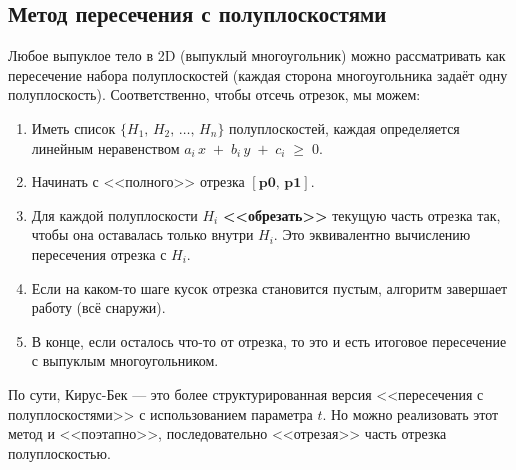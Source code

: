 \documentclass[areasetadvanced]{scrartcl}
\begin{document}
\subsection{Метод пересечения с полуплоскостями}
Любое выпуклое тело в 2D (выпуклый многоугольник) можно рассматривать как 
пересечение набора полуплоскостей (каждая сторона многоугольника задаёт 
одну полуплоскость). Соответственно, чтобы отсечь отрезок, мы можем:

\begin{enumerate}
    \item Иметь список \(\{H_1,\,H_2,\,\dots,\,H_n\}\) полуплоскостей, 
    каждая определяется линейным неравенством 
    \(a_i\,x \;+\; b_i\,y \;+\; c_i \;\ge\; 0\).
    \item Начинать с <<полного>> отрезка \([\mathbf{p0},\, \mathbf{p1}]\).
    \item Для каждой полуплоскости \(H_i\) \textbf{<<обрезать>>} текущую 
    часть отрезка так, чтобы она оставалась только внутри \(H_i\). 
    Это эквивалентно вычислению пересечения отрезка с \(H_i\).
    \item Если на каком-то шаге кусок отрезка становится пустым, алгоритм 
    завершает работу (всё снаружи).
    \item В конце, если осталось что-то от отрезка, то это и есть 
    итоговое пересечение с выпуклым многоугольником.
\end{enumerate}

По сути, Кирус-Бек — это более структурированная версия 
<<пересечения с полуплоскостями>> с использованием параметра \(t\). 
Но можно реализовать этот метод и <<поэтапно>>, последовательно 
<<отрезая>> часть отрезка полуплоскостью.
\end{document}
